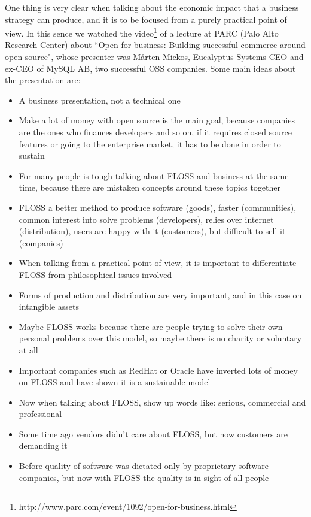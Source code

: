 One thing is very clear when talking about the economic impact that a business strategy can produce, and it is to be focused from a purely practical point of view. In this sence we watched the video\footnote{http://www.parc.com/event/1092/open-for-business.html} of a lecture at PARC (Palo Alto Research Center) about \textquotedblleft Open for business: Building successful commerce around open source", whose presenter was M\aa rten Mickos, Eucalyptus Systems CEO and ex-CEO of MySQL AB, two successful OSS companies. Some main ideas about the presentation are:

\begin{itemize}
\item A business presentation, not a technical one
\item Make a lot of money with open source is the main goal, because companies are the ones who finances developers and so on, if it requires closed source features or going to the enterprise market, it has to be done in order to sustain
\item For many people is tough talking about FLOSS and business at the same time, because there are mistaken concepts around these topics together
\item FLOSS a better method to produce software (goods), faster (communities), common interest into solve problems (developers), relies over internet (distribution), users are happy with it (customers), but difficult to sell it (companies)
\item When talking from a practical point of view, it is important to differentiate FLOSS from philosophical issues involved
\item Forms of production and distribution are very important, and in this case on intangible assets
\item Maybe FLOSS works because there are people trying to solve their own personal problems over this model, so maybe there is no charity or voluntary at all
\item Important companies such as RedHat or Oracle have inverted lots of money on FLOSS and have shown it is a sustainable model
\item Now when talking about FLOSS, show up words like: serious, commercial and professional
\item Some time ago vendors didn't care about FLOSS, but now customers are demanding it
\item Before quality of software was dictated only by proprietary software companies, but now with FLOSS the quality is in sight of all people

\end{itemize}
